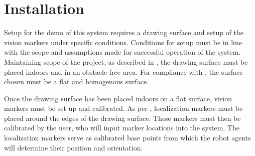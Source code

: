 
\section{Installation}
\label{sec:install}
Setup for the demo of this system requires a drawing surface and setup of the vision markers under specific conditions. Conditions for setup must be in line with the scope and assumptions made for successful operation of the system. Maintaining scope of the project, as described in , the drawing surface must be placed indoors and in an obstacle-free area. For compliance with , the surface chosen must be a flat and homogenous surface.

Once the drawing surface has been placed indoors on a flat surface, vision markers must be set up and calibrated. As per , localization markers must be placed around the edges of the drawing surface. These markers must then be calibrated by the user, who will input marker locations into the system. The localization markers serve as calibrated base points from which the robot agents will determine their position and orientation.


 


